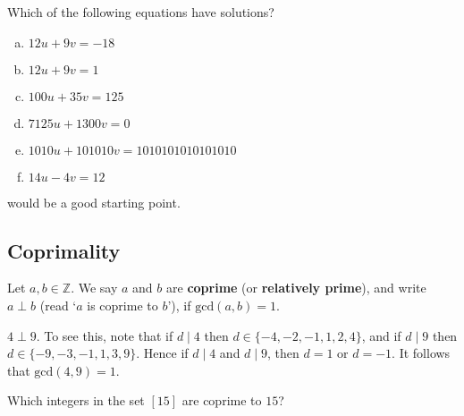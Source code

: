\begin{exercise}
\label{exSolutionsToLDEs}
Which of the following equations have solutions?
\begin{enumerate}[(a)]
\item $12u + 9v = -18$
\item $12u + 9v = 1$
\item $100u + 35v = 125$
\item $7125u + 1300v = 0$
\item $1010u + 101010v = 1010101010101010$
\item $14u - 4v = 12$
\end{enumerate}
\begin{backhint}
 would be a good starting point.
\end{backhint}
\end{exercise}

\subsection*{Coprimality}

\begin{definition}
\label{defCoprime}
Let $a,b \in \mathbb{Z}$. We say $a$ and $b$ are \textbf{coprime} (or \textbf{relatively prime}), and write $a \perp b$  (read `$a$ is coprime to $b$'), if $\mathrm{gcd}(a,b) = 1$.
\end{definition}

\begin{example}
$4 \perp 9$. To see this, note that if $d \mid 4$ then $d \in \{ {-4}, {-2}, {-1}, 1, 2, 4 \}$, and if $d \mid 9$ then $d \in \{ {-9}, {-3}, {-1}, 1, 3, 9 \}$. Hence if $d \mid 4$ and $d \mid 9$, then $d = 1$ or $d = -1$. It follows that $\mathrm{gcd}(4,9)=1$.
\end{example}

\begin{exercise}
\label{exCoprimeTo15}
Which integers in the set $[15]$ are coprime to $15$?
\end{exercise}

